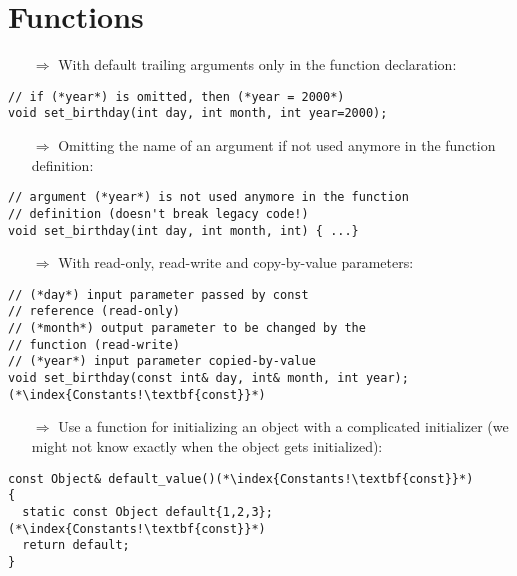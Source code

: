\documentclass[10pt]{book}
\begin{document}
\section{Functions}
\begin{enumerate}
\item[$\Rightarrow$] With default trailing arguments only in the function declaration:
\end{enumerate}
\begin{lstlisting}
// if (*year*) is omitted, then (*year = 2000*)
void set_birthday(int day, int month, int year=2000);
\end{lstlisting}
\begin{enumerate}
\item[$\Rightarrow$] Omitting the name of an argument if not used anymore in the function definition:
\end{enumerate}
\begin{lstlisting}
// argument (*year*) is not used anymore in the function
// definition (doesn't break legacy code!)
void set_birthday(int day, int month, int) { ...}
\end{lstlisting}
\begin{enumerate}
\item[$\Rightarrow$] With read-only, read-write and copy-by-value parameters:
\end{enumerate}
\begin{lstlisting}
// (*day*) input parameter passed by const
// reference (read-only)
// (*month*) output parameter to be changed by the
// function (read-write)
// (*year*) input parameter copied-by-value
void set_birthday(const int& day, int& month, int year);(*\index{Constants!\textbf{const}}*)
\end{lstlisting}
\begin{enumerate}
\item[$\Rightarrow$] Use a function for initializing an object with a complicated initializer (we might not
know exactly when the object gets initialized):
\end{enumerate}
\begin{lstlisting}
const Object& default_value()(*\index{Constants!\textbf{const}}*)
{
  static const Object default{1,2,3};(*\index{Constants!\textbf{const}}*)
  return default;
}
\end{lstlisting}
\end{document}
